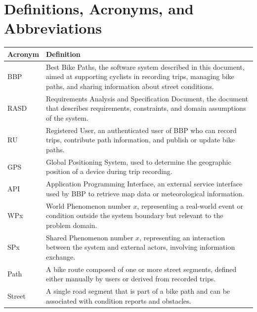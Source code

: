 \pagebreak

\section{Definitions, Acronyms, and Abbreviations}
\label{sec:definitions-acronyms-abbreviations}%

\begin{longtable}{|l|p{}|}
    \hline
    \textbf{Acronym} & \textbf{Definition} \\
    \hline \hline

    BBP &
    Best Bike Paths, the software system described in this document, aimed at supporting cyclists in recording trips,
    managing bike paths, and sharing information about street conditions. \\
    \hline

    RASD &
    Requirements Analysis and Specification Document, the document that describes requirements, constraints,
    and domain assumptions of the system. \\
    \hline

    RU &
    Registered User, an authenticated user of BBP who can record trips, contribute path information,
    and publish or update bike paths. \\
    \hline

    GPS &
    Global Positioning System, used to determine the geographic position of a device during trip recording. \\
    \hline

    API &
    Application Programming Interface, an external service interface used by BBP to retrieve map data
    or meteorological information. \\
    \hline

    WPx &
    World Phenomenon number $x$, representing a real-world event or condition outside the system boundary
    but relevant to the problem domain. \\
    \hline

    SPx &
    Shared Phenomenon number $x$, representing an interaction between the system and external actors,
    involving information exchange. \\
    \hline

    Path &
    A bike route composed of one or more street segments, defined either manually by users
    or derived from recorded trips. \\
    \hline

    Street &
    A single road segment that is part of a bike path and can be associated with condition reports
    and obstacles. \\
    \hline


\end{longtable}
